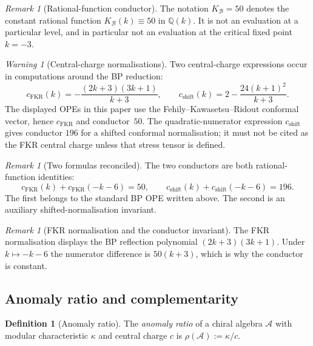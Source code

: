 \documentclass[11pt]{article}
\theoremstyle{plain}
\theoremstyle{definition}
\newtheorem{definition}[theorem]{Definition}
\theoremstyle{remark}
\newtheorem{remark}[theorem]{Remark}
\newtheorem{warning}[theorem]{Warning}
\newcommand{\cA}{\mathcal{A}}
\newcommand{\cB}{\mathcal{B}}
\numberwithin{equation}{section}
\begin{document}
\begin{remark}[Rational-function conductor]
\label{rem:bp-conductor-alias}
The notation $K_{\cB}=50$ denotes the constant rational function
$K_{\cB}(k)\equiv50$ in $\mathbb{Q}(k)$. It is not an evaluation at a
particular level, and in particular not an evaluation at the critical
fixed point $k=-3$.
\end{remark}

\begin{warning}[Central-charge normalisations]\label{warn:conductor-value}
Two central-charge expressions occur in computations around the BP
reduction:
\[
c_{\mathrm{FKR}}(k)=-\frac{(2k+3)(3k+1)}{k+3},\qquad
c_{\mathrm{shift}}(k)=2-\frac{24(k+1)^2}{k+3}.
\]
The displayed OPEs in this paper use the Fehily--Kawasetsu--Ridout
conformal vector, hence $c_{\mathrm{FKR}}$ and conductor~$50$. The
quadratic-numerator expression $c_{\mathrm{shift}}$ gives conductor
$196$ for a shifted conformal normalisation; it must not be cited as
the FKR central charge unless that stress tensor is defined.
\end{warning}

\begin{remark}[Two formulas reconciled]\label{rem:two-formulas}
The two conductors are both rational-function identities:
\[
c_{\mathrm{FKR}}(k)+c_{\mathrm{FKR}}(-k-6)=50,\qquad
c_{\mathrm{shift}}(k)+c_{\mathrm{shift}}(-k-6)=196.
\]
The first belongs to the standard BP OPE written above. The second is
an auxiliary shifted-normalisation invariant.
\end{remark}

\begin{remark}[FKR normalisation and the conductor invariant]
\label{rem:bp-convention-rationale}
The FKR normalisation displays the BP reflection polynomial
$(2k+3)(3k+1)$. Under $k\mapsto-k-6$ the numerator difference is
$50(k+3)$, which is why the conductor is constant.
\end{remark}

\subsection{Anomaly ratio and complementarity}

\begin{definition}[Anomaly ratio]\label{def:anomaly-ratio}
The \emph{anomaly ratio} of a chiral algebra $\cA$ with modular
characteristic $\kappa$ and central charge $c$ is
$\rho(\cA) := \kappa / c$.
\end{definition}
\end{document}
